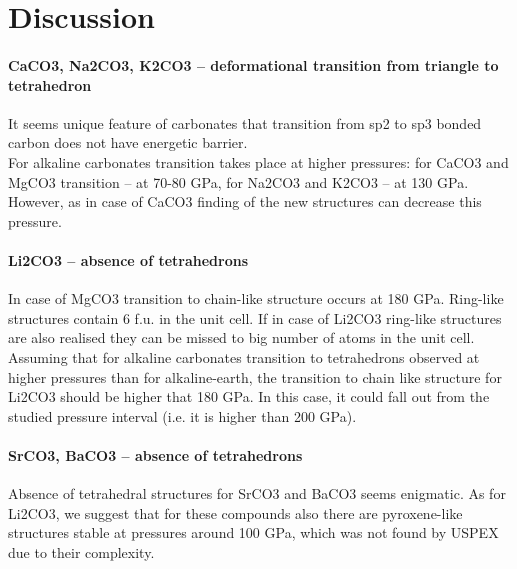 \documentclass[a4paperm]{article}
\begin{document}
\section{Discussion}

	\paragraph{CaCO3, Na2CO3, K2CO3 – deformational transition from triangle to tetrahedron} 
It seems unique feature of carbonates that transition from sp2 to sp3 bonded carbon does not have energetic barrier.  \\
For alkaline carbonates transition takes place at higher pressures: for CaCO3 and MgCO3 transition – at 70-80 GPa, for Na2CO3 and K2CO3 – at 130 GPa. However, as in case of CaCO3 finding of the new structures can decrease this pressure. 
	
	\paragraph{Li2CO3 – absence of tetrahedrons}  
In case of MgCO3 transition to chain-like structure occurs at 180 GPa. Ring-like structures contain 6 f.u. in the unit cell. If in case of Li2CO3 ring-like structures are also realised they can be missed to big number of atoms in the unit cell. Assuming that for alkaline carbonates transition to tetrahedrons observed at higher pressures than for alkaline-earth, the transition to chain like structure for Li2CO3 should be higher that 180 GPa. In this case, it could fall out from the studied pressure interval (i.e. it is higher than 200 GPa).

	\paragraph{SrCO3, BaCO3 – absence of tetrahedrons}
Absence of tetrahedral structures for SrCO3 and BaCO3 seems enigmatic. As for Li2CO3, we suggest that for these compounds also there are pyroxene-like structures stable at pressures around 100 GPa, which was not found by USPEX due to their complexity.

	
\end{document}
